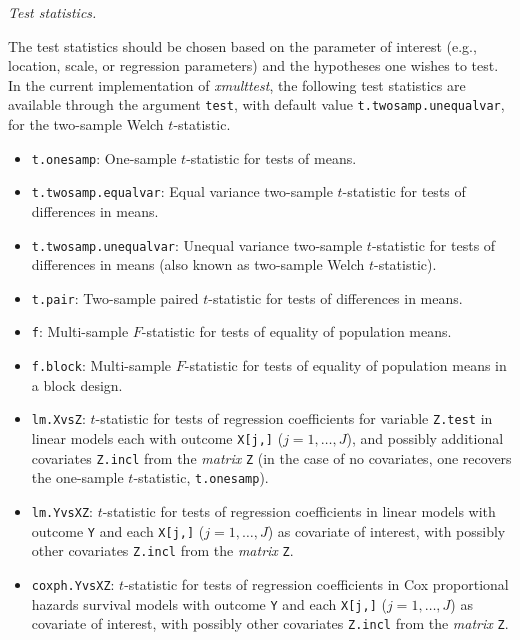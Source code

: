 \documentclass[11pt]{article}
\newcommand{\Rpackage}[1]{\textit{#1}}
\newcommand{\Robject}[1]{\texttt{#1}}
\newcommand{\Rclass}[1]{\textit{#1}}
\begin{document}
\begin{description}
\item{\em Test statistics.} 

The test statistics should be chosen based on the parameter of interest (e.g., location, scale, or regression parameters) and the hypotheses one wishes to test. In the current implementation of \Rpackage{xmulttest}, the following test statistics are available through the argument \Robject{test}, with default value \Robject{t.twosamp.unequalvar}, for the two-sample Welch $t$-statistic. 
\begin{itemize}
\item 
\Robject{t.onesamp}: One-sample $t$-statistic for tests of means.
\item 
\Robject{t.twosamp.equalvar}: Equal variance two-sample $t$-statistic for tests of differences in means.
\item 
\Robject{t.twosamp.unequalvar}: Unequal variance two-sample $t$-statistic for tests of differences in means (also known as two-sample Welch $t$-statistic). 
\item 
\Robject{t.pair}: Two-sample paired $t$-statistic for tests of differences in means.
\item 
\Robject{f}: Multi-sample $F$-statistic for tests of equality of population means.
\item 
\Robject{f.block}: Multi-sample $F$-statistic for tests of equality of population means in a block design.
\item 

\Robject{lm.XvsZ}: 
$t$-statistic for tests of regression coefficients for variable \Robject{Z.test} in linear models each with outcome \Robject{X[j,]} ($j=1,\ldots,J$), and possibly additional covariates \Robject{Z.incl} from the \Rclass{matrix} \Robject{Z} (in the case of no covariates, one recovers the one-sample $t$-statistic, \Robject{t.onesamp}).
\item 
\Robject{lm.YvsXZ}: 
$t$-statistic for tests of regression coefficients in linear models with outcome \Robject{Y} and each \Robject{X[j,]} ($j=1,\ldots,J$) as covariate of interest, with possibly other covariates \Robject{Z.incl} from the \Rclass{matrix} \Robject{Z}.
\item 
\Robject{coxph.YvsXZ}: $t$-statistic for tests of regression coefficients in Cox proportional hazards survival models with outcome \Robject{Y} and each \Robject{X[j,]} ($j=1,\ldots,J$) as covariate of interest, with possibly other covariates \Robject{Z.incl} from the \Rclass{matrix} \Robject{Z}.
\end{itemize}



\end{description}
\end{document}
